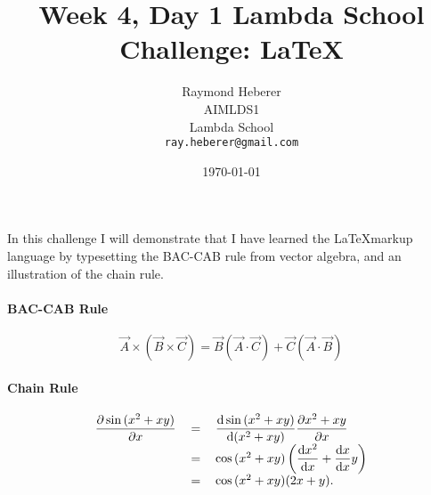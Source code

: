 \documentclass{article}
\begin{document}
\title{Week 4, Day 1 Lambda School Challenge: \LaTeX{}}
\author{Raymond Heberer\\
  AIMLDS1\\
  Lambda School\\
  \texttt{ray.heberer@gmail.com}}
\date{\today}
\maketitle

\paragraph{}
In this challenge I will demonstrate that I have learned the \LaTeX markup language by typesetting the BAC-CAB rule from vector algebra, and an illustration of the chain rule.

\paragraph{BAC-CAB Rule}
$$
\vec{A}\times(\vec{B}\times\vec{C})=\vec{B}(\vec{A}\cdot\vec{C})+\vec{C}(\vec{A}\cdot\vec{B})
$$

\paragraph{Chain Rule}
$$
\begin{tabular}{ r c l }
  \(\displaystyle\pdv{\sin{(x^2+xy)}}{x}\) & \(=\) & \(\displaystyle\dv{\sin{(x^2+xy)}}{(x^2+xy)}\displaystyle\pdv{x^2+xy}{x}\) \\
   & \(=\) & \(\cos{(x^2+xy)}\left(\displaystyle\dv{x^2}{x}+\displaystyle\dv{x}{x}y\right)\) \\
   & \(=\) & \(\cos{(x^2+xy)}(2x+y).\)
\end{tabular}$$
\end{document}
